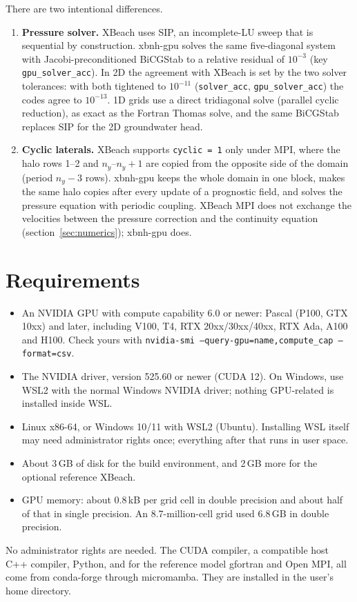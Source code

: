 \documentclass[11pt,a4paper]{article}
\newcommand{\code}[1]{\texttt{#1}}
\begin{document}
There are two intentional differences.
\begin{enumerate}
\item \textbf{Pressure solver.} XBeach uses SIP, an incomplete-LU sweep that is sequential by
construction. xbnh-gpu solves the same five-diagonal system with Jacobi-preconditioned BiCGStab to a
relative residual of $10^{-3}$ (key \code{gpu\_solver\_acc}). In 2D the agreement with XBeach is set by the
two solver tolerances: with both tightened to $10^{-11}$ (\code{solver\_acc}, \code{gpu\_solver\_acc})
the codes agree to $10^{-13}$. 1D grids use a direct tridiagonal solve (parallel cyclic reduction), as
exact as the Fortran Thomas solve, and the same BiCGStab replaces SIP for the 2D groundwater head.
\item \textbf{Cyclic laterals.} XBeach supports \code{cyclic = 1} only under MPI, where the halo rows
1--2 and $n_y$--$n_y+1$ are copied from the opposite side of the domain (period $n_y-3$ rows). xbnh-gpu
keeps the whole domain in one block, makes the same halo copies after every update of a prognostic field,
and solves the pressure equation with periodic coupling. XBeach MPI does not exchange the velocities
between the pressure correction and the continuity equation (section~\ref{sec:numerics}); xbnh-gpu does.
\end{enumerate}

\section{Requirements}

\begin{itemize}
\item An NVIDIA GPU with compute capability 6.0 or newer: Pascal (P100, GTX 10xx) and later, including
      V100, T4, RTX 20xx/30xx/40xx, RTX Ada, A100 and H100. Check yours with \code{nvidia-smi
      --query-gpu=name,compute\_cap --format=csv}.
\item The NVIDIA driver, version 525.60 or newer (CUDA 12). On Windows, use WSL2 with the normal Windows
      NVIDIA driver; nothing GPU-related is installed inside WSL.
\item Linux x86-64, or Windows 10/11 with WSL2 (Ubuntu). Installing WSL itself may need administrator
      rights once; everything after that runs in user space.
\item About 3\,GB of disk for the build environment, and 2\,GB more for the optional reference XBeach.
\item GPU memory: about 0.8\,kB per grid cell in double precision and about half of that in single precision. An
      8.7-million-cell grid used 6.8\,GB in double precision.
\end{itemize}
No administrator rights are needed. The CUDA compiler, a compatible host C++ compiler, Python, and for
the reference model gfortran and Open MPI, all come from conda-forge through micromamba. They are
installed in the user's home directory.
\end{document}
